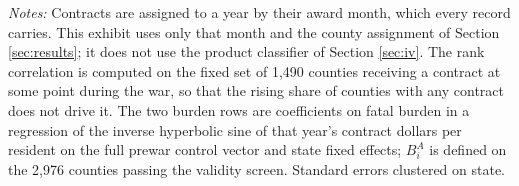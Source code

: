 \documentclass[12pt]{article}
\newcommand{\fittab}[1]{%
  \sbox{\tabbox}{#1}%
  \ifdim\wd\tabbox>\textwidth
    \resizebox{\textwidth}{!}{\usebox{\tabbox}}%
  \else\usebox{\tabbox}\fi}
\begin{document}
\begin{table}[p]
\centering
\caption{The allocation function, re-estimated for each year of the war}
\label{tab:byyear}
\fittab{}
\vspace{2pt}
\begin{minipage}{\textwidth}\footnotesize \textit{Notes:} Contracts are
assigned to a year by their award month, which every record carries. This
exhibit uses only that month and the county assignment of Section
\ref{sec:results}; it does not use the product classifier of Section
\ref{sec:iv}. The rank
correlation is computed on the fixed set of 1{,}490 counties receiving a
contract at some point during the war, so that the rising share of counties with
any contract does not drive it. The two burden rows are coefficients on fatal
burden in a regression of the inverse hyperbolic sine of that year's contract
dollars per resident on the full prewar control vector and state fixed effects;
$B_i^{A}$ is defined on the 2{,}976 counties passing the validity screen.
Standard errors clustered on state.
\end{minipage}
\end{table}

\label{app:main}
\end{document}
